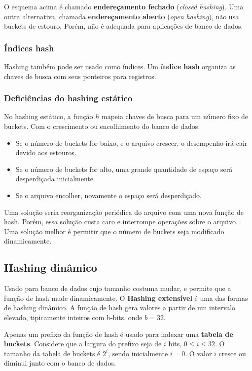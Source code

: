 O esquema acima é chamado \textbf{endereçamento fechado} (\emph{closed hashing}).
Uma outra alternativa,
chamada \textbf{endereçamento aberto} (\emph{open hashing}), não usa buckets de estouro.
Porém, não é adequada para aplicações de banco de dados.

\subsubsection{Índices hash}

Hashing também pode ser usado como índices. 
Um \textbf{índice hash} organiza as chaves de busca com seus ponteiros para registros.

\subsubsection{Deficiências do hashing estático}

No hashing estático, a função $h$ mapeia chaves de busca para um número fixo de buckets.
Com o crescimento ou encolhimento do banco de dados:
\begin{itemize}
\item Se o número de buckets for baixo, e o arquivo crescer, o desempenho
irá cair devido aos estouros.
\item Se o número de buckets for alto, uma grande quantidade de espaço
será desperdiçada inicialmente.
\item Se o arquivo encolher, novamente o espaço será desperdiçado.
\end{itemize}

Uma solução seria reorganização periódica do arquivo com uma nova função de hash.
Porém, essa solução custa caro e interrompe operações sobre o arquivo.
Uma solução melhor é permitir que o número de buckets seja modificado
dinamicamente.

\subsection{Hashing dinâmico}

Usado para banco de dados cujo tamanho costuma mudar, e permite que a função
de hash mude dinamicamente.
O \textbf{Hashing extensível} é uma das formas de hashing dinâmico.
A função de hash gera valores a partir de um intervalo elevado, tipicamente
inteiros com b-bits, onde $b = 32$.

Apenas um prefixo da função de hash é usado para indexar uma \textbf{tabela de buckets}.
Considere que a largura do prefixo seja de $i$ bits, $0 \leq i \leq 32$.
O tamanho da tabela de buckets é $2^i$, sendo inicialmente $i= 0$.
O valor $i$ cresce ou diminui junto com o banco de dados.

